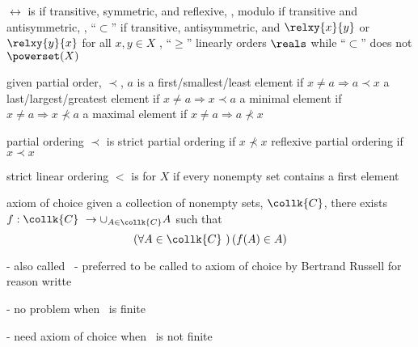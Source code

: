 \documentclass[17pt,landscape]{foils}
\newcommand\coll{\collk{C}}
\begin{document}
{	\vitem $\rel$ is
	\bit
		\vitem {} if transitive, symmetric, and reflexive, \eg, modulo%
		\vitem {} if transitive and antisymmetric, \eg, ``$\subset$''%
		\vitem {} if transitive, antisymmetric, and $\relxy{x}{y}$ or $\relxy{y}{x}$ for all $x,y\in X$%
		\bit
			\iitem \eg, ``$\geq$'' linearly orders $\reals$ while ``$\subset$'' does not $\powerset(X)$%
		\eit
	\eit
%
\eit



\bit
	\item given partial order, $\prec$, $a$ is
	\bit
		\vitem a first/smallest/least element if $x \neq a \Rightarrow a\prec x$
		\vitem a last/largest/greatest element if $x \neq a \Rightarrow x\prec a$
		\vitem a minimal element if $x \neq a \Rightarrow x \not\prec a$
		\vitem a maximal element if $x \neq a \Rightarrow a \not\prec x$
	\eit

	\vvitem partial ordering $\prec$ is
	\bit
		\vitem strict partial ordering if $x\not\prec x$
		\vitem reflexive partial ordering if $x\prec x$
	\eit

	\vvitem strict linear ordering $<$ is
	\bit
		\vitem {} for $X$ if every nonempty set contains a first element
	\eit
\eit



\begin{myaxiom}{axiom of choice}
	given a collection of nonempty sets, $\coll$,
	there exists $f:\coll\ \to \cup_{A\in\coll} A $ such that
	$$
		\left(
			\forall A\in\coll\
		\right)
		\left(
			f(A) \in A
		\right)
	$$
\end{myaxiom}

\bit
\item [-]
	also called %
		\
		- preferred to be called to axiom of choice by Bertrand Russell
		for reason writte \
\item [-]
	no problem when \coll\ is finite
\item [-]
	need axiom of choice when \coll\ is not finite
\eit
\vfill

}
\end{document}
